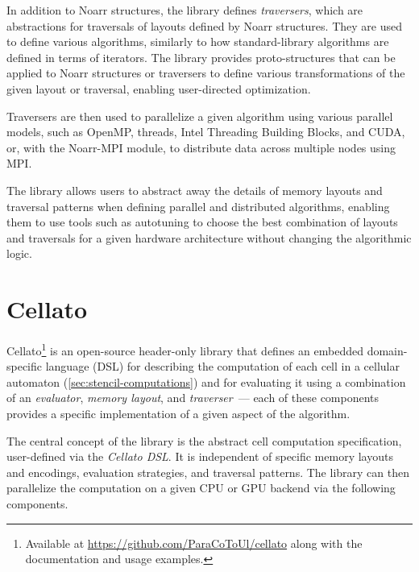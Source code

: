 In addition to Noarr structures, the library defines \emph{traversers}, which are abstractions for traversals of layouts defined by Noarr structures. They are used to define various algorithms, similarly to how standard-library algorithms are defined in terms of iterators. The library provides proto-structures that can be applied to Noarr structures or traversers to define various transformations of the given layout or traversal, enabling user-directed optimization.

Traversers are then used to parallelize a given algorithm using various parallel models, such as OpenMP, \cpp threads, Intel Threading Building Blocks, and CUDA\@, or, with the Noarr-MPI module, to distribute data across multiple nodes using MPI\@.

The library allows users to abstract away the details of memory layouts and traversal patterns when defining parallel and distributed algorithms, enabling them to use tools such as autotuning to choose the best combination of layouts and traversals for a given hardware architecture without changing the algorithmic logic.


\section{Cellato}\label{sec:sw-cellato}

Cellato\footnote{Available at \url{https://github.com/ParaCoToUl/cellato} along with the documentation and usage examples.} is an open-source \cpptwenty header-only library that defines an embedded domain-specific language (DSL) for describing the computation of each cell in a cellular automaton (\cref{sec:stencil-computations}) and for evaluating it using a combination of an \emph{evaluator}, \emph{memory layout}, and \emph{traverser}~--- each of these components provides a specific implementation of a given aspect of the algorithm.


The central concept of the library is the abstract cell computation specification, user-defined via the \emph{Cellato DSL}. It is independent of specific memory layouts and encodings, evaluation strategies, and traversal patterns. The library can then parallelize the computation on a given CPU or GPU backend via the following components.

